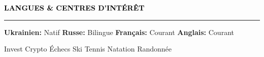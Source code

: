 \documentclass[10pt,english,french]{article}
\newlength{\mpwidth}
\newcommand{\cvsection}[1]{
    \vspace{4pt}
    \textbf{\fontsize{9pt}{10pt}\selectfont \textcolor{black}{#1}}
    \vspace{6pt}
    \hrule
    \vspace{6pt}
}
\newcommand{\cvtextnotab}[1]{
    \parbox{1\mpwidth}{#1}
}
\begin{document}
\vspace{-3pt}
\cvsection{LANGUES \& CENTRES D'INTÉRÊT}

\vspace{-3pt}
\cvtextnotab{\textbf{Ukrainien\!:} Natif \hspace{20pt} \textbf{Russe\!:} Bilingue \hspace{12pt} \textbf{Français\!:} Courant \hspace{12pt} \textbf{Anglais\!:} Courant}

\vspace{-8pt}
\cvtextnotab{
    Invest \hspace{12pt}
    Crypto \hspace{12pt}
    Échecs \hspace{12pt}
    Ski \hspace{12pt}
    Tennis \hspace{12pt}
    Natation \hspace{12pt}
    Randonnée
}
\end{document}
